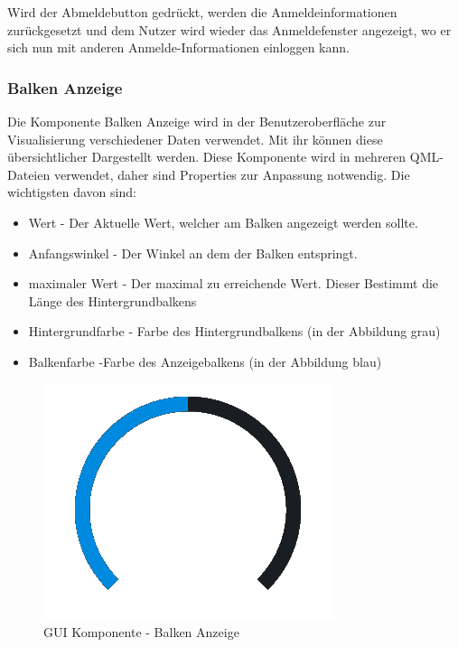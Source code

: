 Wird der Abmeldebutton gedrückt, werden die Anmeldeinformationen zurückgesetzt und dem Nutzer wird wieder das Anmeldefenster angezeigt, wo er sich nun mit anderen Anmelde-Informationen einloggen kann.

\newpage

\subsubsection{Balken Anzeige}

Die Komponente Balken Anzeige wird in der Benutzeroberfläche zur Visualisierung verschiedener Daten verwendet. Mit ihr können diese übersichtlicher Dargestellt werden. Diese Komponente wird in mehreren QML-Dateien verwendet, daher sind Properties zur Anpassung notwendig. Die wichtigsten davon sind:

\begin{itemize}
	\item Wert - Der Aktuelle Wert, welcher am Balken angezeigt werden sollte.
	\item Anfangswinkel - Der Winkel an dem der Balken entspringt.
	\item maximaler Wert - Der maximal zu erreichende Wert. Dieser Bestimmt die Länge des Hintergrundbalkens
	\item Hintergrundfarbe - Farbe des Hintergrundbalkens (in der Abbildung grau)
	\item Balkenfarbe -Farbe des Anzeigebalkens (in der Abbildung blau)
\end{itemize}

\begin{figure}[H]
	\begin{center}
		\includegraphics[scale=0.5]{figures/hcis/component_bar.png}
		\caption{GUI Komponente - Balken Anzeige}
		\label{fig:kompBalken}
	\end{center}
\end{figure}

